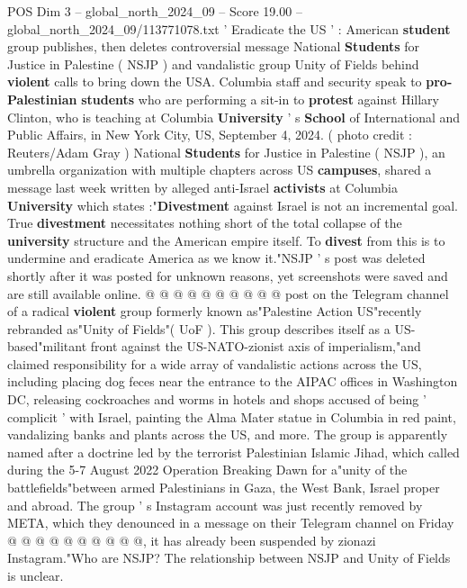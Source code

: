\begin{textsample}{POS Dim 3 – global\_north\_2024\_09 – Score 19.00 – global\_north\_2024\_09/113771078.txt}  \label{ex:f3_pos_163}
' Eradicate the US ' : American \textbf{student} group publishes, then deletes controversial message National \textbf{Students} for Justice in Palestine ( NSJP ) and vandalistic group Unity of Fields behind \textbf{violent} calls to bring down the USA.
Columbia staff and security speak to \textbf{pro-Palestinian} \textbf{students} who are performing a sit-in to \textbf{protest} against Hillary Clinton, who is teaching at Columbia \textbf{University} ' s \textbf{School} of International and Public Affairs, in New York City, US, September 4, 2024. ( photo credit : Reuters/Adam Gray ) National \textbf{Students} for Justice in Palestine ( NSJP ), an umbrella organization with multiple chapters across US \textbf{campuses}, shared a message last week written by alleged anti-Israel \textbf{activists} at Columbia \textbf{University} which states :"\textbf{Divestment} against Israel is not an incremental goal.
True \textbf{divestment} necessitates nothing short of the total collapse of the \textbf{university} structure and the American empire itself.
To \textbf{divest} from this is to undermine and eradicate America as we know it."NSJP ' s post was deleted shortly after it was posted for unknown reasons, yet screenshots were saved and are still available online. @ @ @ @ @ @ @ @ @ @ post on the Telegram channel of a radical \textbf{violent} group formerly known as"Palestine Action US"recently rebranded as"Unity of Fields"( UoF ).
This group describes itself as a US-based"militant front against the US-NATO-zionist axis of imperialism,"and claimed responsibility for a wide array of vandalistic actions across the US, including placing dog feces near the entrance to the AIPAC offices in Washington DC, releasing cockroaches and worms in hotels and shops accused of being ' complicit ' with Israel, painting the Alma Mater statue in Columbia in red paint, vandalizing banks and plants across the US, and more.
The group is apparently named after a doctrine led by the terrorist Palestinian Islamic Jihad, which called during the 5-7 August 2022 Operation Breaking Dawn for a"unity of the battlefields"between armed Palestinians in Gaza, the West Bank, Israel proper and abroad.
The group ' s Instagram account was just recently removed by META, which they denounced in a message on their Telegram channel on Friday @ @ @ @ @ @ @ @ @ @, it has already been suspended by zionazi Instagram."Who are NSJP?
The relationship between NSJP and Unity of Fields is unclear.

\end{textsample}

